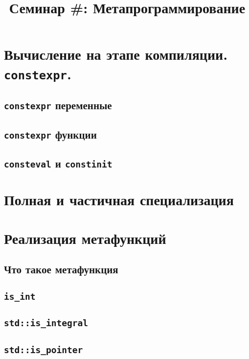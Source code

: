 \documentclass{article}
\begin{document}
\title{Семинар \#: Метапрограммирование \vspace{-5ex}}\date{}\maketitle


\section*{Вычисление на этапе компиляции. \texttt{constexpr}.}

\subsection*{\texttt{constexpr} переменные}
\subsection*{\texttt{constexpr} функции}
\subsection*{\texttt{consteval} и \texttt{constinit}}

\section*{Полная и частичная специализация}

\section*{Реализация метафункций}

\subsection*{Что такое метафункция}

\subsection*{\texttt{is\_int}}

\subsection*{\texttt{std::is\_integral}}

\subsection*{\texttt{std::is\_pointer}}
\end{document}
